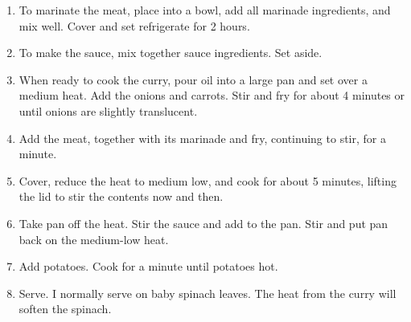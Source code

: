 \documentclass[11pt,a4paper]{article}
\begin{document}
\begin{enumerate}
  \item To marinate the meat, place into a bowl, add all marinade ingredients, and mix well.
        Cover and set refrigerate for 2 hours.
        
  \item To make the sauce, mix together sauce ingredients. Set aside.
  
  \item When ready to cook the curry, pour oil into a large pan and set over a medium heat.
        Add the onions and carrots. Stir and fry for about 4 minutes or until onions are 
        slightly translucent.
        
  \item Add the meat, together with its marinade and fry, continuing to stir, for a minute.
  
  \item Cover, reduce the heat to medium low, and cook for about 5 minutes, lifting the lid
        to stir the contents now and then.
        
  \item Take pan off the heat. Stir the sauce and add to the pan. Stir and put pan back on
        the medium-low heat.
        
  \item Add potatoes. Cook for a minute until potatoes hot.
  
  \item Serve. 
        I normally serve on baby spinach leaves. The heat from the curry will soften the spinach.
        
\end{enumerate}
\end{document}
